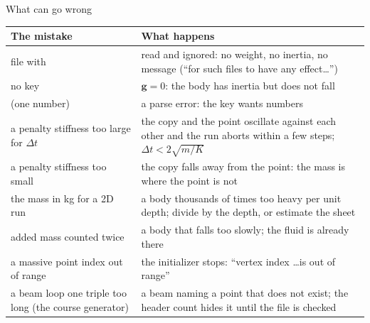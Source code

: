 \documentclass[aspectratio=169,11pt]{beamer}
\begin{document}
\begin{frame}{What can go wrong}
\label{fr:wrong}
\scriptsize
\begin{tabular}{@{}L{0.3\textwidth}L{0.62\textwidth}@{}}
\toprule
The mistake & What happens\\
\midrule
{} file with  & read and ignored: no weight, no inertia, no message (``for such files to have any effect\ldots'')\\
no  key & $\mathbf{g} = 0$: the body has inertia but does not fall\\
 (one number) & a parse error: the key wants  numbers\\
a penalty stiffness too large for $\Delta t$ & the copy and the point oscillate against each other and the run aborts within a few steps; $\Delta t < 2\sqrt{m/K}$\\
a penalty stiffness too small & the copy falls away from the point: the mass is where the point is not\\
the mass in kg for a 2D run & a body thousands of times too heavy per unit depth; divide by the depth, or estimate the sheet\\
added mass counted twice & a body that falls too slowly; the fluid is already there\\
a massive point index out of range & the initializer stops: ``vertex index \ldots is out of range''\\
a beam loop one triple too long (the course generator) & a beam naming a point that does not exist; the header count hides it until the file is checked\\
\bottomrule
\end{tabular}
\end{frame}
\end{document}
